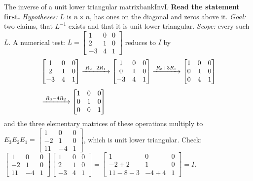 \documentclass[11pt]{article}
\begin{document}
\begin{exmp}{The inverse of a unit lower triangular matrix}{bankInvL}
\textbf{Read the statement first.} \emph{Hypotheses:} $L$ is $n\times n$, has ones on the diagonal and zeros above it. \emph{Goal:} two claims, that $L^{-1}$ exists and that it is unit lower triangular. \emph{Scope:} every such $L$. A numerical test: $L=\begin{bmatrix}1&0&0\\2&1&0\\-3&4&1\end{bmatrix}$ reduces to $I$ by
\begin{align*}
&\begin{bmatrix}1&0&0\\2&1&0\\-3&4&1\end{bmatrix}
\xrightarrow{\;R_2-2R_1\;}
\begin{bmatrix}1&0&0\\0&1&0\\-3&4&1\end{bmatrix}
\xrightarrow{\;R_3+3R_1\;}
\begin{bmatrix}1&0&0\\0&1&0\\0&4&1\end{bmatrix}\\[4pt]
&\xrightarrow{\;R_3-4R_2\;}
\begin{bmatrix}1&0&0\\0&1&0\\0&0&1\end{bmatrix}
\end{align*}
and the three elementary matrices of these operations multiply to $E_3E_2E_1=\begin{bmatrix}1&0&0\\-2&1&0\\11&-4&1\end{bmatrix}$, which is unit lower triangular. Check: $\begin{bmatrix}1&0&0\\-2&1&0\\11&-4&1\end{bmatrix}\begin{bmatrix}1&0&0\\2&1&0\\-3&4&1\end{bmatrix}=\begin{bmatrix}1&0&0\\-2+2&1&0\\11-8-3&-4+4&1\end{bmatrix}=I$.


\end{exmp}
\end{document}
